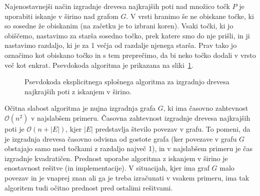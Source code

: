 \documentclass[a4paper, 12pt]{book}
\newcommand{\OO}{\ensuremath{\mathcal{O}}} %
\begin{document}
Najenostavnejši način izgradnje drevesa najkrajših poti nad množico točk $P$ je uporabiti iskanje v širino nad grafom $G$. V vrsti hranimo še ne obiskane točke, ki so sosedne že obiskanim (na začetku je to izbrani koren). Vsaki točki, ki jo obiščemo, nastavimo za starša sosedno točko, prek katere smo do nje prišli, in ji nastavimo razdaljo, ki je za 1 večja od razdalje njenega starša. Prav tako jo označimo kot obiskano točko in s tem preprečimo, da bi neko točko dodali v vrsto več kot enkrat. Psevdokoda algoritma je prikazana na sliki~\ref{fig:genericBfs}. 
\begin{figure}[htp]
\begin{center}
\end{center}
\caption{Psevdokoda eksplicitnega splošnega algoritma za izgradnjo drevesa najkrajših poti z iskanjem v širino.}
\label{fig:genericBfs}
\end{figure}
Očitna slabost algoritma je nujna izgradnja grafa $G$, ki ima časovno zahtevnost $\OO(n^2)$ v najslabšem primeru. Časovna zahtevnost izgradnje drevesa najkrajših poti je $\OO(n + |E|)$, kjer $|E|$ predstavlja število povezav v grafu. To pomeni, da je izgradnja drevesa časovno odvisna od gostote grafa (ker povezave v grafu $G$ obstajajo samo med točkami z razdaljo največ 1), in v najslabšem primeru je čas izgradnje kvadratičen. Prednost uporabe algoritma z iskanjem v širino je enostavnost rešitve (in implementacije). V situacijah, kjer ima graf $G$ malo povezav in je vnaprej znan ali ga je treba izračunati v vsakem primeru, ima tak algoritem tudi očitno prednost pred ostalimi rešitvami. 

\end{document}
